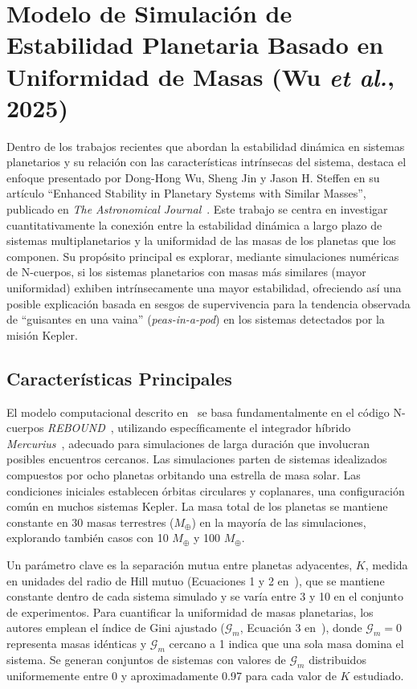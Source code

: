 
\section[Modelo de Estabilidad Planetaria]{Modelo de Simulación de Estabilidad Planetaria Basado en Uniformidad de Masas (Wu \textit{et al.}, 2025)}%
\label{sec:wu_model}

Dentro de los trabajos recientes que abordan la estabilidad dinámica en sistemas planetarios y su relación con las características intrínsecas del sistema, destaca el enfoque presentado por Dong-Hong Wu, Sheng Jin y Jason H. Steffen en su artículo ``Enhanced Stability in Planetary Systems with Similar Masses'', publicado en \textit{The Astronomical Journal}~\cite{Wu2025}. Este trabajo se centra en investigar cuantitativamente la conexión entre la estabilidad dinámica a largo plazo de sistemas multiplanetarios y la uniformidad de las masas de los planetas que los componen. Su propósito principal es explorar, mediante simulaciones numéricas de N-cuerpos, si los sistemas planetarios con masas más similares (mayor uniformidad) exhiben intrínsecamente una mayor estabilidad, ofreciendo así una posible explicación basada en sesgos de supervivencia para la tendencia observada de ``guisantes en una vaina'' (\textit{peas-in-a-pod}) en los sistemas detectados por la misión Kepler.

\subsection{Características Principales}
El modelo computacional descrito en~\cite{Wu2025} se basa fundamentalmente en el código N-cuerpos \textit{REBOUND}~\cite{Rein2012}, utilizando específicamente el integrador híbrido \textit{Mercurius}~\cite{rein2019}, adecuado para simulaciones de larga duración que involucran posibles encuentros cercanos. Las simulaciones parten de sistemas idealizados compuestos por ocho planetas orbitando una estrella de masa solar. Las condiciones iniciales establecen órbitas circulares y coplanares, una configuración común en muchos sistemas Kepler. La masa total de los planetas se mantiene constante en 30 masas terrestres ($M_\oplus$) en la mayoría de las simulaciones, explorando también casos con 10 $M_\oplus$ y 100 $M_\oplus$.

Un parámetro clave es la separación mutua entre planetas adyacentes, $K$, medida en unidades del radio de Hill mutuo (Ecuaciones 1 y 2 en~\cite{Wu2025}), que se mantiene constante dentro de cada sistema simulado y se varía entre 3 y 10 en el conjunto de experimentos. Para cuantificar la uniformidad de masas planetarias, los autores emplean el índice de Gini ajustado ($\mathcal{G}_m$, Ecuación 3 en~\cite{Wu2025}), donde $\mathcal{G}_m = 0$ representa masas idénticas y $\mathcal{G}_m$ cercano a 1 indica que una sola masa domina el sistema. Se generan conjuntos de sistemas con valores de $\mathcal{G}_m$ distribuidos uniformemente entre 0 y aproximadamente 0.97 para cada valor de $K$ estudiado.

